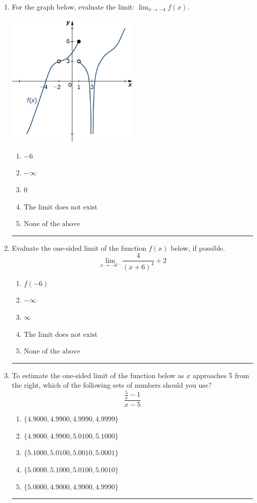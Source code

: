 \documentclass[14pt]{extbook}
\newcommand{\litem}[1]{\item#1\hspace*{-1cm}\rule{\textwidth}{0.4pt}}
\begin{document}
\begin{enumerate}
{\begin{enumerate}[label=\Alph*.]
\end{enumerate} }
\litem{
For the graph below, evaluate the limit: $ \displaystyle \lim_{x \rightarrow -4} f(x)$.
\begin{center}
    \includegraphics[width=0.5\textwidth]{../Figures/evaluateLimitGraphicallyA.png}
\end{center}
\begin{enumerate}[label=\Alph*.]
\item \( -6 \)
\item \( -\infty \)
\item \( 0 \)
\item \( \text{The limit does not exist} \)
\item \( \text{None of the above} \)

\end{enumerate} }
\litem{
Evaluate the one-sided limit of the function $f(x)$ below, if possible.\[ \lim_{x \rightarrow -6^-} \frac{4}{(x+6)^4}+2 \]\begin{enumerate}[label=\Alph*.]
\item \( f(-6) \)
\item \( -\infty \)
\item \( \infty \)
\item \( \text{The limit does not exist} \)
\item \( \text{None of the above} \)

\end{enumerate} }
\litem{
To estimate the one-sided limit of the function below as $x$ approaches 5 from the right, which of the following sets of numbers should you use?\[ \frac{\frac{5}{x} - 1}{x - 5} \]\begin{enumerate}[label=\Alph*.]
\item \( \{ 4.9000, 4.9900, 4.9990, 4.9999 \} \)
\item \( \{ 4.9000, 4.9900, 5.0100, 5.1000 \} \)
\item \( \{ 5.1000, 5.0100, 5.0010, 5.0001 \} \)
\item \( \{ 5.0000, 5.1000, 5.0100, 5.0010 \} \)
\item \( \{ 5.0000, 4.9000, 4.9900, 4.9990 \} \)


\end{enumerate}}
\end{enumerate}
\end{document}
